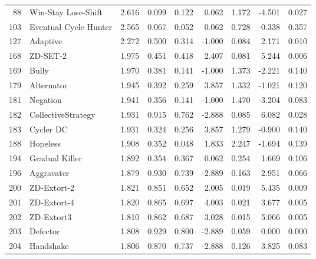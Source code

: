 \documentclass[10pt,letterpaper]{article}
\begin{document}
\begin{table}[!hbtp]
\begin{adjustwidth}{-2.25in}{0in}
\begin{tabular}{rlrrrrrrr}
   88 &   Win-Stay Lose-Shift &           2.616 &       0.099 &  0.122 &          0.062 &     1.172 &    -4.501 &    0.027 \\
  103 & Eventual Cycle Hunter &           2.565 &       0.067 &  0.052 &          0.062 &     0.728 &    -0.338 &    0.357 \\
  127 &              Adaptive &           2.272 &       0.500 &  0.314 &         -1.000 &     0.084 &     2.171 &    0.010 \\
  168 &              ZD-SET-2 &           1.975 &       0.451 &  0.418 &          2.407 &     0.081 &     5.244 &    0.006 \\
  169 &                 Bully &           1.970 &       0.381 &  0.141 &         -1.000 &     1.373 &    -2.221 &    0.140 \\
  179 &            Alternator &           1.945 &       0.392 &  0.259 &          3.857 &     1.332 &    -1.021 &    0.120 \\
  181 &              Negation &           1.941 &       0.356 &  0.141 &         -1.000 &     1.470 &    -3.204 &    0.083 \\
  182 &    CollectiveStrategy &           1.931 &       0.915 &  0.762 &         -2.888 &     0.085 &     6.082 &    0.028 \\
  183 &             Cycler DC &           1.931 &       0.324 &  0.256 &          3.857 &     1.279 &    -0.900 &    0.140 \\
  188 &              Hopeless &           1.908 &       0.352 &  0.048 &          1.833 &     2.247 &    -1.694 &    0.139 \\
  194 &        Gradual Killer &           1.892 &       0.354 &  0.367 &          0.062 &     0.254 &     1.669 &    0.106 \\
  196 &            Aggravater &           1.879 &       0.930 &  0.739 &         -2.889 &     0.163 &     2.951 &    0.066 \\
  200 &           ZD-Extort-2 &           1.821 &       0.851 &  0.652 &          2.005 &     0.019 &     5.435 &    0.009 \\
  201 &           ZD-Extort-4 &           1.820 &       0.865 &  0.697 &          4.003 &     0.021 &     3.677 &    0.005 \\
  202 &            ZD-Extort3 &           1.810 &       0.862 &  0.687 &          3.028 &     0.015 &     5.066 &    0.005 \\
  203 &              Defector &           1.808 &       0.929 &  0.800 &         -2.889 &     0.059 &     0.000 &    0.000 \\
  204 &             Handshake &           1.806 &       0.870 &  0.737 &         -2.888 &     0.126 &     3.825 &    0.083 \\
\hline
\end{tabular}
    \end{adjustwidth}
\end{table}
\end{document}

